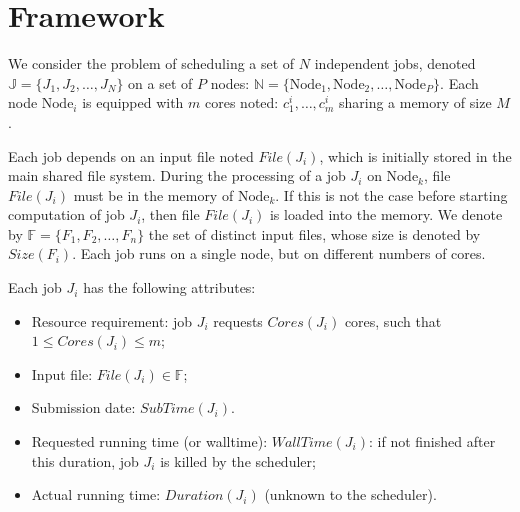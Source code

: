 \documentclass[conference,10pt]{IEEEtran}
\newcommand{\Node}[1]{\ensuremath{\mathrm{Node}_{#1}}\xspace}
\newcommand{\file}{\ensuremath{\mathit{File}}\xspace}
\newcommand{\size}{\ensuremath{\mathit{Size}}\xspace}
\newcommand{\duration}{\mathit{Duration}\xspace}
\newcommand{\core}{\mathit{Cores}\xspace}
\newcommand{\submissiontime}{\mathit{SubTime}\xspace}
\newcommand{\walltime}{\mathit{WallTime}\xspace}
\newcommand{\fileset}{\ensuremath{\mathbb{F}}\xspace}
\newcommand{\jobset}{\ensuremath{\mathbb{J}}\xspace}
\newcommand{\nodeset}{\ensuremath{\mathbb{N}}\xspace}
\begin{document}

\section{Framework}\label{sec.framework}

We consider the problem of scheduling a set of $N$ independent jobs,
denoted $\jobset = \{J_1, J_2, \ldots, J_N\}$ on a set of $P$ nodes:
$\nodeset = \{\Node{1}, \Node{2}, \ldots, \Node{P}\}$.
Each node $\Node{i}$ is equipped with $m$ cores noted:
$c^i_1,\ldots,c^i_m$ sharing a memory of size $M$.

Each job depends on an input file noted $\file(J_i)$, which is
initially stored in the main shared file system.  During the
processing of a job $J_i$ on $\Node{k}$, file $\file(J_i)$ must be in
the memory of $\Node{k}$. If this is not the case before starting
computation of job $J_i$, then file $\file(J_i)$ is loaded into the
memory.  We denote by $\fileset = \{F_1, F_2, \ldots, F_n\}$ the set
of distinct input files, whose size is denoted by $\size(F_i)$. Each
job runs on a single node, but on different numbers of cores.



Each job $J_i$ has the following attributes:
\begin{itemize}
\item Resource requirement: job $J_i$ requests $\core(J_i)$  cores, such that $1 \leq \core(J_i) \leq m$;
\item Input file: $\file(J_i) \in \fileset$;
\item Submission date: $\submissiontime(J_i)$.
\item Requested running time (or walltime): $\walltime(J_i)$: if not
  finished after this duration, job $J_i$ is killed by the scheduler;
\item Actual running time: $\duration(J_i)$ (unknown to  the scheduler).
\end{itemize}
\end{document}
